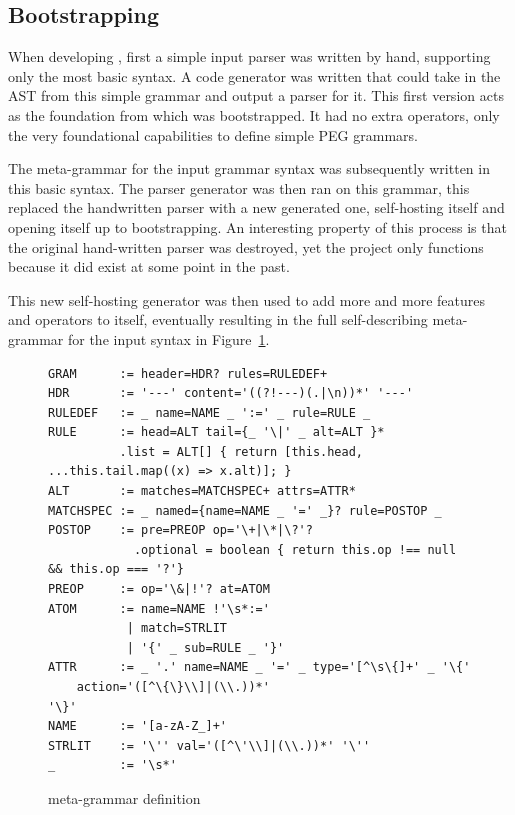\subsection{Bootstrapping}

When developing \tsPEG{}, first a simple input parser was written by hand, supporting only the most basic syntax. A code generator was written that could take in the AST from this simple grammar and output a parser for it. This first version acts as the foundation from which \tsPEG{} was bootstrapped. It had no extra operators, only the very foundational capabilities to define simple PEG grammars.

The meta-grammar for the input grammar syntax was subsequently written in this basic syntax. The parser generator was then ran on this grammar, this replaced the handwritten parser with a new generated one, self-hosting itself and opening itself up to bootstrapping. An interesting property of this process is that the original hand-written parser was destroyed, yet the project only functions because it did exist at some point in the past.

This new self-hosting generator was then used to add more and more features and operators to itself, eventually resulting in the full self-describing meta-grammar for the \tsPEG{} input syntax in Figure~\ref{tspegsyntax}.

\begin{figure}
    \caption{\tsPEG{} meta-grammar definition}
    \label{tspegsyntax}
    \begin{lstlisting}[language=tspeg]
GRAM      := header=HDR? rules=RULEDEF+
HDR       := '---' content='((?!---)(.|\n))*' '---'
RULEDEF   := _ name=NAME _ ':=' _ rule=RULE _
RULE      := head=ALT tail={_ '\|' _ alt=ALT }*
          .list = ALT[] { return [this.head, ...this.tail.map((x) => x.alt)]; }
ALT       := matches=MATCHSPEC+ attrs=ATTR*
MATCHSPEC := _ named={name=NAME _ '=' _}? rule=POSTOP _
POSTOP    := pre=PREOP op='\+|\*|\?'?
            .optional = boolean { return this.op !== null && this.op === '?'}
PREOP     := op='\&|!'? at=ATOM
ATOM      := name=NAME !'\s*:='
           | match=STRLIT
           | '{' _ sub=RULE _ '}'
ATTR      := _ '.' name=NAME _ '=' _ type='[^\s\{]+' _ '\{'
    action='([^\{\}\\]|(\\.))*'
'\}'
NAME      := '[a-zA-Z_]+'
STRLIT    := '\'' val='([^\'\\]|(\\.))*' '\''
_         := '\s*'
    \end{lstlisting}
\end{figure}

